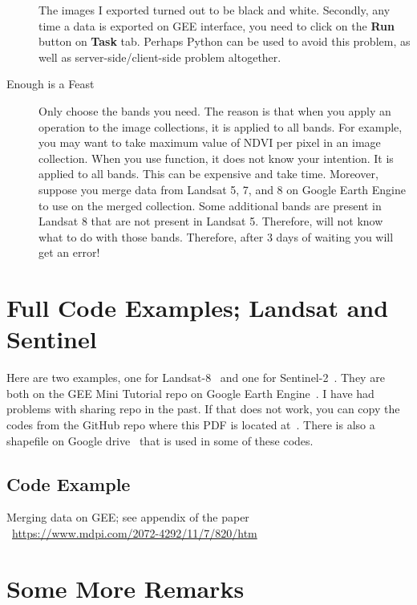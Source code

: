 \begin{description}
The images I exported turned out to be black and white.
Secondly, any time a data is exported on GEE interface, you need
to click on the \textbf{Run} button on \textbf{Task} tab. Perhaps Python
can be used to avoid this problem, as well as server-side/client-side
problem altogether.

\item [Enough is a Feast] Only choose the bands you need.
The reason is that when you apply an operation to the image collections,
it is applied to all bands.
For example, you may want to take maximum value of NDVI per pixel in an image collection. When you use  function, it does not know
your intention. It is applied to all bands. This can be expensive and
take time. Moreover, suppose you merge data from Landsat 5, 7, and 8
on Google Earth Engine to use  on the merged collection.
Some additional bands are present in Landsat 8 that are not present in
Landsat 5. Therefore,  will not know what to do
with those bands.
Therefore, after 3 days of waiting you will get an error!
\end{description}

\section{Full Code Examples; Landsat and Sentinel}

Here are two examples, one for Landsat-8~\citep{FullCodeLandsat8} 
and one for Sentinel-2~\citep{FullCodeSentinel}.
They are both on the GEE Mini Tutorial repo on 
Google Earth Engine~\citep{GEEMiniTutorialRepoonEE}. 
I have had problems with sharing repo in the past.
If that does not work, you can copy the codes
from the GitHub repo where this PDF is located
at~\citep{MiniTutorialOnGitHub}.
There is also a shapefile on Google drive~\citep{ShapeFileOnDrive} that is used
in some of these codes.

\subsection{Code Example}
Merging data on GEE; see appendix of the paper\\
~\href{https://www.mdpi.com/2072-4292/11/7/820/htm}{https://www.mdpi.com/2072-4292/11/7/820/htm}

\section{Some More Remarks}
\label{sec:SomeMoreRemarks}

